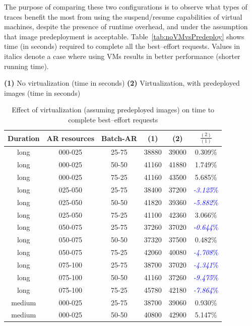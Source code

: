 The purpose of comparing these two configurations is to observe what types of traces benefit the most from using the suspend/resume capabilities of virtual machines, despite the presence of runtime overhead, and under the assumption that image predeployment is acceptable. Table~\ref{tab:noVMvsPredeploy} shows time (in seconds) required to complete all the best--effort requests. Values in italics denote a case where using VMs results in better performance (shorter running time).

\begin{table}
\begin{center}
\caption{Effect of virtualization (assuming predeployed images) on time to complete best--effort requests}
\textbf{(1)} No virtualization (time in seconds)
\textbf{(2)} Virtualization, with predeployed images (time in seconds)
\begin{tabular}{|c|c|c|c|c|c|}
\hline
\textbf{Duration} & \textbf{AR resources} & \textbf{Batch-AR} & \textbf{(1)} & \textbf{(2)}& \textbf{$\frac{(2)}{(1)}$}
\\\hline
long & 000-025 & 25-75 & 38880 & 39000 & 0.309\%
\\\hline
long & 000-025 & 50-50 & 41160 & 41880 & 1.749\%
\\\hline
long & 000-025 & 75-25 & 41160 & 43500 & 5.685\%
\\\hline
long & 025-050 & 25-75 & 38400 & 37200 & \textcolor{blue}{\textit{-3.125}\%}
\\\hline
long & 025-050 & 50-50 & 41820 & 39360 & \textcolor{blue}{\textit{-5.882}\%}
\\\hline
long & 025-050 & 75-25 & 41100 & 42360 & 3.066\%
\\\hline
long & 050-075 & 25-75 & 37260 & 37020 & \textcolor{blue}{\textit{-0.644}\%}
\\\hline
long & 050-075 & 50-50 & 37320 & 37500 & 0.482\%
\\\hline
long & 050-075 & 75-25 & 42060 & 40080 & \textcolor{blue}{\textit{-4.708}\%}
\\\hline
long & 075-100 & 25-75 & 38700 & 37020 & \textcolor{blue}{\textit{-4.341}\%}
\\\hline
long & 075-100 & 50-50 & 41160 & 37260 & \textcolor{blue}{\textit{-9.475}\%}
\\\hline
long & 075-100 & 75-25 & 45780 & 42180 & \textcolor{blue}{\textit{-7.864}\%}
\\\hline
medium & 000-025 & 25-75 & 38700 & 39060 & 0.930\%
\\\hline
medium & 000-025 & 50-50 & 40800 & 42900 & 5.147\%

\end{tabular}
\end{center}
\end{table}
